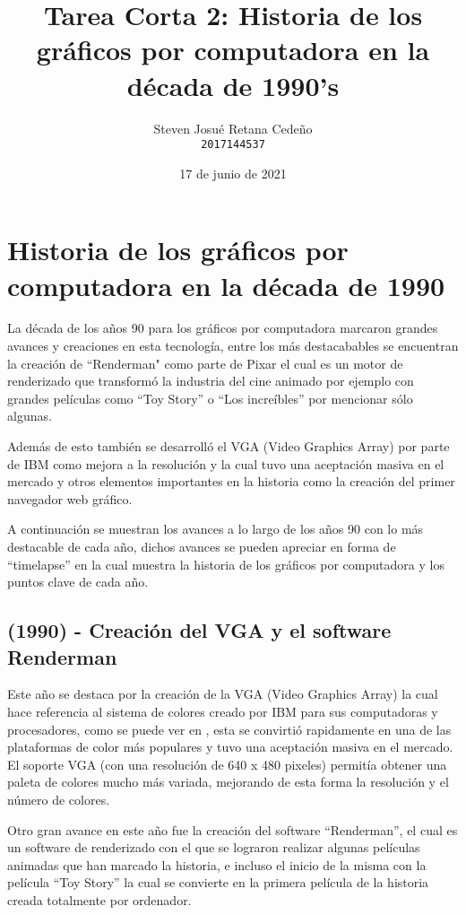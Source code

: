 \documentclass[12pt,letter paper]{article}
\title{Tarea Corta 2: Historia de los gráficos por computadora en la década de 1990's}
\author{Steven Josué Retana Cedeño\\
\texttt{2017144537}
}
\date{17 de junio de 2021}
\begin{document}
\maketitle
\newpage

\section{Historia de los gráficos por computadora en la década de 1990}

La década de los años 90 para los gráficos por computadora marcaron grandes avances y creaciones en esta tecnología, entre los más destacabables se encuentran la creación de ``Renderman" como parte de Pixar el cual es un motor de renderizado que transformó la industria del cine animado por ejemplo con grandes películas como ``Toy Story'' o ``Los increíbles'' por mencionar sólo algunas.\vspace{\baselineskip}

Además de esto también se desarrolló el VGA (Video Graphics Array) por parte de IBM como mejora a la resolución y la cual tuvo una aceptación masiva en el mercado y otros elementos importantes en la historia como la creación del primer navegador web gráfico.\vspace{\baselineskip}

A continuación se muestran los avances a lo largo de los años 90 con lo más destacable de cada año, dichos avances se pueden apreciar en forma de ``timelapse'' en \cite{Historia} la cual muestra la historia de los gráficos por computadora y los puntos clave de cada año.\vspace{\baselineskip}

\subsection{(1990) - Creación del VGA y el software Renderman }

Este año se destaca por la creación de la VGA (Video Graphics Array) la cual hace referencia al sistema de colores creado por IBM para sus computadoras y procesadores, como se puede ver en \cite{VGA}, esta se convirtió rapidamente en una de las plataformas de color más populares y tuvo una aceptación masiva en el mercado. El soporte VGA (con una resolución de 640 x 480 pixeles) permitía obtener una paleta de colores mucho más variada, mejorando de esta forma la resolución y el número de colores.\vspace{\baselineskip}

Otro gran avance en este año fue la creación del software ``Renderman'', el cual es un software de renderizado con el que se lograron realizar algunas películas animadas que han marcado la historia, e incluso el inicio de la misma con la película ``Toy Story'' la cual se convierte en la primera película de la historia creada totalmente por ordenador. \cite{Renderman}  \vspace{\baselineskip}
\end{document}
